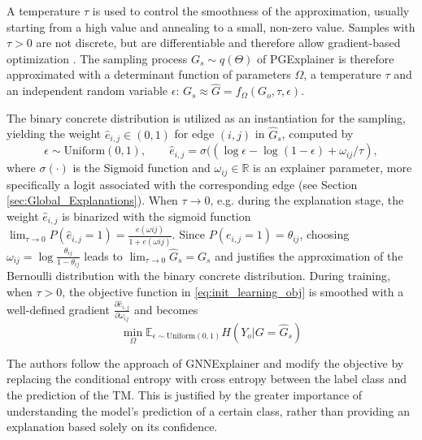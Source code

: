 A temperature $\tau$ is used to control the smoothness of the approximation, usually starting from a high value and annealing to a small, non-zero value. Samples with $\tau > 0$ are not discrete, but are differentiable and therefore allow gradient-based optimization \cite{abid2019concrete}. The sampling process $G_s \sim q(\Theta)$ of PGExplainer is therefore approximated with a determinant function of parameters $\Omega$, a temperature $\tau$ and an independent random variable $\epsilon$: $G_s \approx \hat{G}=f_\Omega(G_o,\tau,\epsilon)$. 

The binary concrete distribution \cite{maddison2016concrete} is utilized as an instantiation for the sampling, yielding the weight $\hat{e}_{i,j} \in (0,1)$ for edge $(i,j)$ in $\hat{G}_s$, computed by
\begin{equation}
    \label{eq:reparam_trick}
    \epsilon \sim \text{Uniform}(0,1), \qquad \hat{e}_{i,j}=\sigma((\log \epsilon - \log(1-\epsilon)+\omega_{ij}/\tau),
\end{equation}
where $\sigma(\cdot)$ is the Sigmoid function and $\omega_{ij} \in \mathbb{R}$ is an explainer parameter, more specifically a logit associated with the corresponding edge (see Section \ref{sec:Global_Explanations}). When $\tau \rightarrow 0$, e.g. during the explanation stage, the weight $\hat{e}_{i,j}$ is binarized with the sigmoid function $\lim_{\tau\rightarrow 0}P(\hat{e}_{i,j} = 1) = \frac{e(\omega{ij})}{1+e(\omega{ij})}$. Since $P(e_{i,j} = 1) = \theta_{ij}$, choosing $\omega_{ij} = \log\frac{\theta_{ij}}{1-\theta_{ij}}$ leads to $\lim_{\tau\rightarrow 0}\hat{G}_s = G_s$ and justifies the approximation of the Bernoulli distribution with the binary concrete distribution. During training, when $\tau > 0$, the objective function in \eqref{eq:init_learning_obj} is smoothed with a well-defined gradient $\frac{\partial\hat{e}_{i,j}}{\partial\omega_{ij}}$ and becomes
\begin{equation}
    \min_\Omega \mathbb{E}_{\epsilon \sim \text{Uniform}(0,1)}H(Y_o| G = \hat{G}_s)
\end{equation}

The authors follow the approach of GNNExplainer \cite{ying2019gnnexplainer} and modify the objective by replacing the conditional entropy with cross entropy between the label class and the prediction of the \ac{TM}. This is justified by the greater importance of understanding the model's prediction of a certain class, rather than providing an explanation based solely on its confidence.


